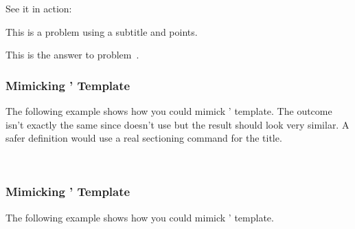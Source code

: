 \documentclass{xsim-manual}
\begin{document}
See it in action:
\begin{example}
  \begin{problem}[subtitle=My subtitle,points=5]
    This is a problem using a subtitle and points.
  \end{problem}
  \begin{answer}
    This is the answer to problem~.
  \end{answer}
\end{example}

\subsubsection{Mimicking '  Template}
\label{sec:runin-template}

The following example shows how you could mimick ' 
template.  The outcome isn't exactly the same since  doesn't use
 but the result should look very similar.  A safer definition
would use a real sectioning command for the title.

\begin{sourcecode}
  \usepackage{needspace}
    {%
      \par\vspace{\baselineskip}
      \noindent
      \textbf{\XSIMmixedcase{\GetExerciseName}~}%
    }
    {}
\end{sourcecode}

\subsubsection{Mimicking '  Template}
\label{sec:margin-template}

The following example shows how you could mimick '
 template.

\begin{sourcecode}
    {%
      \trivlist
      \item[\llap{%
        \smash{%
          \tabular[t]{@{}r@{}}
            \textbf{\XSIMmixedcase{\GetExerciseName}~\GetExerciseProperty{counter}}
            \IfExercisePropertySetT{points}{%
              \tabularnewline
              (%
                \printgoal{\GetExerciseProperty{points}}%
                \GetExercisePropertyT{bonus-points}{+\printgoal{#1}}%
                \,\XSIMtranslate{point-abbr}%
              )%
            }%
          \endtabular
        }%
      }]\relax
    }
    {\endtrivlist}
\end{sourcecode}
\end{document}
